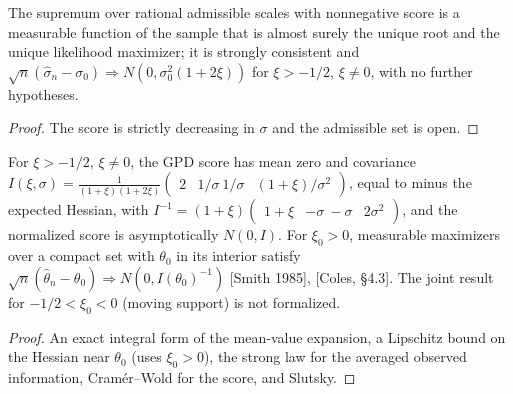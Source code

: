 \begin{theorem}
  \label{thm:gpd-scale-mle-measurable}
  \leanok
  The supremum over rational admissible scales with nonnegative score is a measurable function of the sample that is
  almost surely the unique root and the unique likelihood maximizer; it is strongly consistent and
  $\sqrt n(\hat\sigma_n - \sigma_0) \Rightarrow N(0, \sigma_0^2(1+2\xi))$ for $\xi > -1/2$, $\xi \ne 0$, with no further hypotheses.
\end{theorem}
\begin{proof}
  \leanok
  The score is strictly decreasing in $\sigma$ and the admissible set is open.
\end{proof}

\begin{theorem}
  \label{thm:gpd-joint-normality}
  \leanok
  For $\xi > -1/2$, $\xi \ne 0$, the GPD score has mean zero and covariance
  $I(\xi,\sigma) = \frac{1}{(1+\xi)(1+2\xi)}\begin{pmatrix} 2 & 1/\sigma \ 1/\sigma & (1+\xi)/\sigma^2 \end{pmatrix}$, equal to minus the expected
  Hessian, with $I^{-1} = (1+\xi)\begin{pmatrix} 1+\xi & -\sigma \ -\sigma & 2\sigma^2 \end{pmatrix}$, and the normalized score is
  asymptotically $N(0, I)$. For $\xi_0 > 0$, measurable maximizers over a compact set with $\theta_0$ in its interior satisfy
  $\sqrt n(\hat\theta_n - \theta_0) \Rightarrow N(0, I(\theta_0)^{-1})$ [Smith 1985], [Coles, \S4.3]. The joint result for
  $-1/2 < \xi_0 < 0$ (moving support) is not formalized.
\end{theorem}
\begin{proof}
  \leanok
  An exact integral form of the mean-value expansion, a Lipschitz bound on the Hessian near $\theta_0$ (uses $\xi_0 > 0$), the strong
  law for the averaged observed information, Cram\'er--Wold for the score, and Slutsky.
\end{proof}

